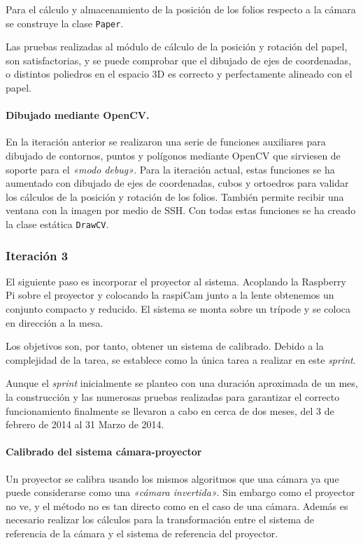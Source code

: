 Para el cálculo y almacenamiento de la posición de los folios respecto a la cámara se construye la clase \texttt{Paper}.

Las pruebas realizadas al módulo de cálculo de la posición y rotación del papel, son satisfactorias, y se puede comprobar que el dibujado de ejes de coordenadas, o distintos poliedros en el espacio 3D es correcto y perfectamente alineado con el papel. 

\paragraph{Dibujado mediante OpenCV.}
En la iteración anterior se realizaron una serie de funciones auxiliares para dibujado de contornos, puntos y polígonos mediante OpenCV que sirviesen de soporte para el \textit{«modo debug»}. Para la iteración actual, estas funciones se ha aumentado con dibujado de ejes de coordenadas, cubos y ortoedros para validar los cálculos de la posición y rotación de los folios. También permite recibir una ventana con la imagen por medio de SSH. Con todas estas funciones se ha creado la clase estática \texttt{DrawCV}. 

\subsubsection{Iteración 3}
El siguiente paso es incorporar el proyector al sistema. Acoplando la Raspberry Pi sobre el proyector y colocando la raspiCam junto a la lente obtenemos un conjunto compacto y reducido. El sistema se monta sobre un trípode y se coloca en dirección a la mesa.

Los objetivos son, por tanto, obtener un sistema de calibrado. Debido a la complejidad de la tarea, se establece como la única tarea a realizar en este \textit{sprint}.

Aunque el \textit{sprint} inicialmente se planteo con una duración aproximada de un mes, la construcción y las numerosas pruebas realizadas para garantizar el correcto funcionamiento finalmente se llevaron a cabo en cerca de dos meses, del 3 de febrero de 2014 al 31 Marzo de 2014. 

\paragraph{Calibrado del sistema cámara-proyector}
Un proyector se calibra usando los mismos algoritmos que una cámara ya que puede considerarse como una \textit{«cámara invertida»}. Sin embargo como el proyector no ve, y el método no es tan directo como en el caso de una cámara. Además es necesario realizar los cálculos para la transformación entre el sistema de referencia de la cámara y el sistema de referencia del proyector.

